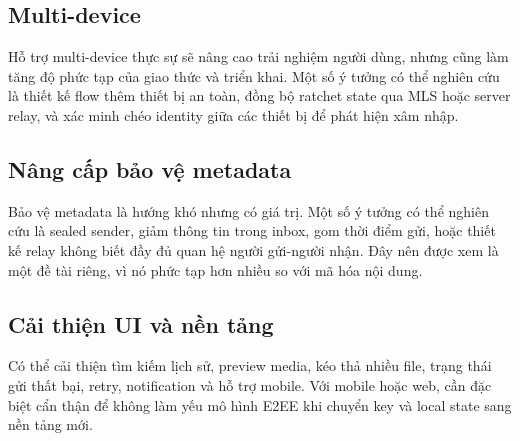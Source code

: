 \subsection{Multi-device}

Hỗ trợ multi-device thực sự sẽ nâng cao trải nghiệm người dùng, nhưng cũng làm tăng độ phức tạp của giao thức và triển khai. Một số ý tưởng có thể nghiên cứu là thiết kế flow thêm thiết bị an toàn, đồng bộ ratchet state qua MLS hoặc server relay, và xác minh chéo identity giữa các thiết bị để phát hiện xâm nhập.

\subsection{Nâng cấp bảo vệ metadata}

Bảo vệ metadata là hướng khó nhưng có giá trị. Một số ý tưởng có thể nghiên cứu là sealed sender, giảm thông tin trong inbox, gom thời điểm gửi, hoặc thiết kế relay không biết đầy đủ quan hệ người gửi-người nhận. Đây nên được xem là một đề tài riêng, vì nó phức tạp hơn nhiều so với mã hóa nội dung.

\subsection{Cải thiện UI và nền tảng}

Có thể cải thiện tìm kiếm lịch sử, preview media, kéo thả nhiều file, trạng thái gửi thất bại, retry, notification và hỗ trợ mobile. Với mobile hoặc web, cần đặc biệt cẩn thận để không làm yếu mô hình E2EE khi chuyển key và local state sang nền tảng mới.
